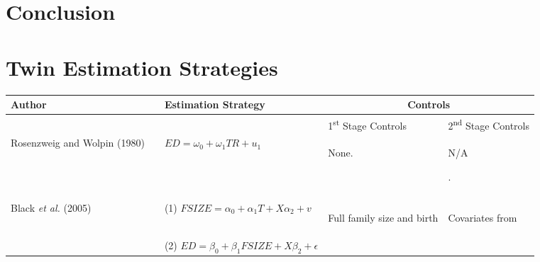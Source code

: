 \documentclass{article}[11pt,subeqn]
\begin{document}
\begin{spacing}{1.25}
\section{Conclusion}

\newpage


\newpage
\appendix
\section{Twin Estimation Strategies}
\label{scn:litrev}

\vspace{19.2cm}	

\begin{center}
\begin{rotate}{90}
\begin{tabular}{lp{4mm}lll}\toprule
Author& &  Estimation Strategy & \multicolumn{2}{c}{Controls} \\ \midrule
&& & \hspace{5mm}1\textsuperscript{st} Stage Controls & 2\textsuperscript{nd} Stage Controls \\  \cmidrule(r){4-4} \cmidrule{5-5}
Rosenzweig and Wolpin (1980) & &
$ED=\omega_0+\omega_1 TR+u_1$&
\begin{small}None.\end{small}&
\begin{small}N\slash A\end{small}.
\\
\begin{footnotesize}\end{footnotesize}&\begin{footnotesize}\end{footnotesize}&\begin{footnotesize}\end{footnotesize}&\begin{footnotesize}\end{footnotesize}&\begin{footnotesize}\end{footnotesize}\\
\multirow{2}{*}{Black \emph{et al.} (2005)} & &
(1) $FSIZE=\alpha_0 + \alpha_1 T + X\alpha_2 + v$ &
\begin{small}Full family size and  birth \end{small}&
\begin{small}Covariates from\end{small}
\\
& &
(2) $ED=\beta_0+\beta_1 FSIZE + X\beta_2 + \epsilon$ &

\end{tabular}
\end{rotate}
\end{center}
\end{spacing}
\end{document}
